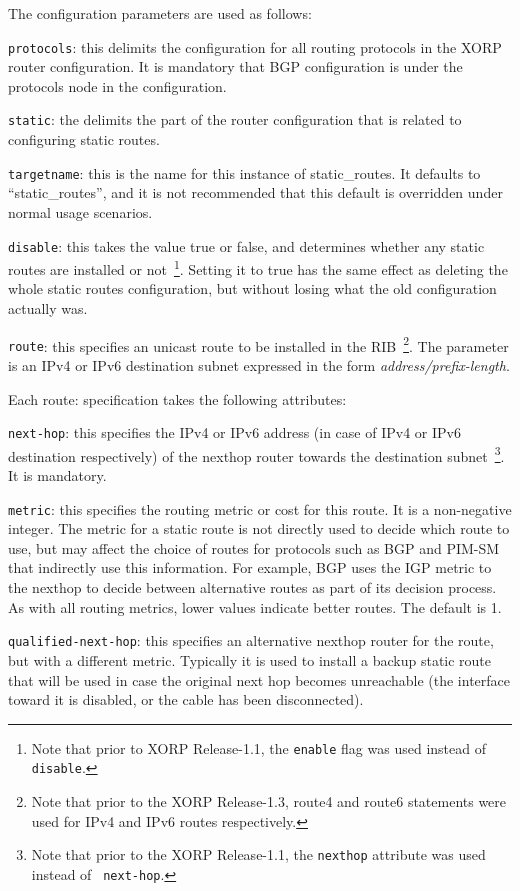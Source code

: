 The configuration parameters are used as follows:
\begin{description}
\item{\tt protocols}: this delimits the configuration for all routing
  protocols in the XORP router configuration.  It is mandatory that
  BGP configuration is under the {\stt protocols} node in the
  configuration.
\item{\tt static}: the delimits the part of the router configuration
  that is related to configuring static routes.
\item{\tt targetname}: this is the name for this instance of
  static\_routes.  It defaults to ``{\stt static\_routes}'', and it is
  not recommended that this default is overridden under normal usage
  scenarios.
\item{\tt disable}: this takes the value {\stt true} or {\stt false},
  and determines whether any static routes are installed or not~\footnote{Note
  that prior to XORP Release-1.1, the {\tt enable} flag was used instead of
  {\tt disable}.}.
  Setting it to {\stt true} has the same effect as deleting the whole
  static routes configuration, but without losing what the old
  configuration actually was.
\item{\tt route}: this specifies an unicast route to be installed in the
  RIB~\footnote{Note that prior to the XORP Release-1.3, route4 and route6
  statements were used for IPv4 and IPv6 routes respectively.}.  The
  parameter is an IPv4 or IPv6 destination subnet expressed in the form
  {\it address/prefix-length}.

  Each {\stt route}: specification takes the following attributes:
\begin{description}
\item{\tt next-hop}: this specifies the IPv4 or IPv6 address (in case of
  IPv4 or IPv6 destination respectively) of the nexthop router towards
  the destination subnet~\footnote{Note that prior to the XORP
  Release-1.1, the {\tt nexthop} attribute was used instead of {\tt
  next-hop}.}. It is mandatory.
\item{\tt metric}: this specifies the routing metric or cost for this
  route.  It is a non-negative integer.  The metric for a static route
  is not directly used to decide which route to use, but may affect
  the choice of routes for protocols such as BGP and PIM-SM that
  indirectly use this information.  For example, BGP uses the IGP
  metric to the nexthop to decide between alternative routes as part
  of its decision process.  As with all routing metrics, lower values
  indicate better routes. The default is 1.
\item{\tt qualified-next-hop}: this specifies an alternative nexthop
  router for the route, but with a different metric. Typically it is
  used to install a backup static route that will be used in case the
  original next hop becomes unreachable (\eg the interface toward it is
  disabled, or the cable has been disconnected).


\end{description}
\end{description}
